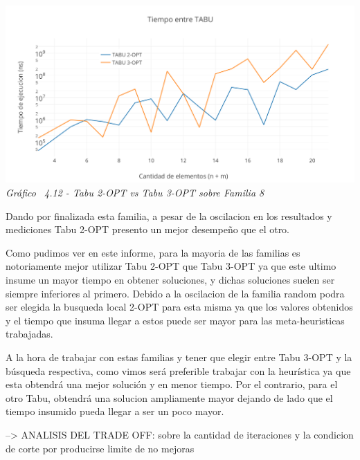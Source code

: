 \vspace*{0.3cm} \vspace*{0.3cm}
  \begin{center}
 \includegraphics[scale=0.5]{./EJ4/medicionrandom.png}\\
 {            \textit{Gráfico \ 4.12 - Tabu 2-OPT vs Tabu 3-OPT sobre Familia 8}}
  \end{center}
  \vspace*{0.3cm}
  
Dando por finalizada esta familia, a pesar de la oscilacion en los resultados y mediciones Tabu 2-OPT presento un mejor desempeño que el otro. 

Como pudimos ver en este informe, para la mayoria de las familias es notoriamente mejor utilizar Tabu 2-OPT que Tabu 3-OPT ya que este ultimo insume un mayor tiempo en obtener soluciones, y dichas soluciones suelen ser siempre inferiores al primero.
Debido a la oscilacion de la familia random podra ser elegida la busqueda local 2-OPT para esta misma ya que los valores obtenidos y el tiempo que insuma llegar a estos puede ser mayor para las meta-heuristicas trabajadas.

A la hora de trabajar con estas familias y tener que elegir entre Tabu 3-OPT y la b\'usqueda respectiva, como vimos ser\'a preferible trabajar con la heur\'istica ya que esta obtendr\'a una mejor soluci\'on y en menor tiempo. Por el contrario, para el otro Tabu, obtendr\'a una solucion ampliamente mayor dejando de lado que el tiempo insumido pueda llegar a ser un poco mayor.


--> ANALISIS DEL TRADE OFF: sobre la cantidad de iteraciones y la condicion de corte por producirse limite de no mejoras

